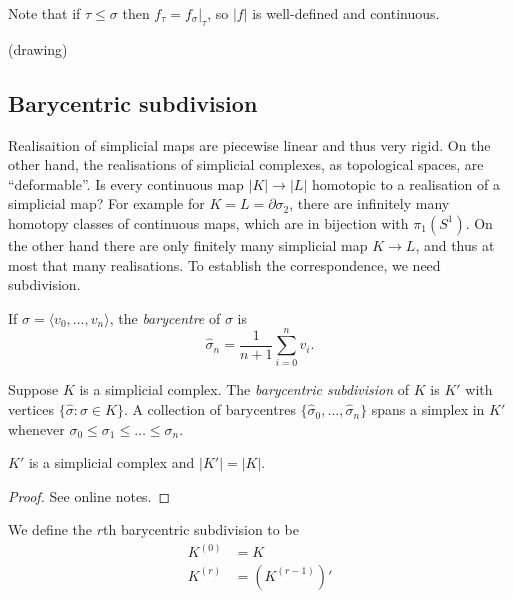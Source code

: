 \documentclass[a4paper]{article}
\renewcommand{\b}{\partial} %
\begin{document}
Note that if \(\tau \leq \sigma\) then \(f_\tau = f_\sigma|_\tau\), so \(|f|\) is well-defined and continuous.
\begin{eg}
  (drawing)
\end{eg}

\subsection{Barycentric subdivision}

Realisaition of simplicial maps are piecewise linear and thus very rigid. On the other hand, the realisations of simplicial complexes, as topological spaces, are ``deformable''. Is every continuous map \(|K| \to |L|\) homotopic to a realisation of a simplicial map? For example for \(K = L = \b \sigma_2\), there are infinitely many homotopy classes of continuous maps, which are in bijection with \(\pi_1(S^1)\). On the other hand there are only finitely many simplicial map \(K \to L\), and thus at most that many realisations. To establish the correspondence, we need subdivision.

\begin{definition}[barycentre]
  If \(\sigma = \langle v_0, \dots, v_n \rangle\), the \emph{barycentre} of \(\sigma\) is
  \[
    \hat \sigma_n = \frac{1}{n + 1} \sum_{i = 0}^n v_i.
  \]
\end{definition}

\begin{definition}
  Suppose \(K\) is a simplicial complex. The \emph{barycentric subdivision} of \(K\) is \(K'\) with vertices \(\{\hat \sigma: \sigma \in K\}\). A collection of barycentres \(\{\hat \sigma_0, \dots, \hat \sigma_n\}\) spans a simplex in \(K'\) whenever \(\sigma_0 \leq \sigma_1 \leq \dots \leq \sigma_n\).
\end{definition}

\begin{lemma}
  \(K'\) is a simplicial complex and \(|K'| = |K|\).
\end{lemma}

\begin{proof}
  See online notes.
\end{proof}

\begin{definition}
  We define the \(r\)th barycentric subdivision to be
  \begin{align*}
    K^{(0)} &= K \\
    K^{(r)} &= (K^{(r - 1)})'
  \end{align*}
\end{definition}
\end{document}
